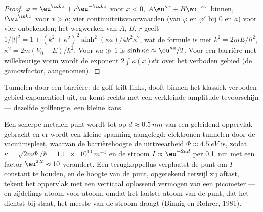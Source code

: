 \begin{proof}
$\varphi = \eu^{\iu kx} + r\eu^{-\iu kx}$ voor $x < 0$,
$A\eu^{\kappa x} + B\eu^{-\kappa x}$
binnen, $t\eu^{\iu kx}$ voor $x > a$; vier continuïteitsvoorwaarden (van $\varphi$
en $\varphi'$ bij $0$ en $a$) voor vier onbekenden; het wegwerken van $A$, $B$, $r$
geeft $1/|t|^2 = 1 + (k^2 + \kappa^2)^2\sinh^2(\kappa a)/4k^2\kappa^2$, wat
de formule is met $k^2 = 2mE/\hbar^2$, $\kappa^2 = 2m(V_0 - E)/\hbar^2$. Voor
$\kappa a \gg 1$ is $\sinh\kappa a \approx \eu^{\kappa a}/2$. Voor een barrière met
willekeurige vorm wordt de exponent $2\int\kappa(x)\dd x$ over het
verboden gebied (de gamowfactor, aangenomen).
\end{proof}

\begin{omfigure}

{\small Tunnelen door een barrière: de golf trilt links,
dooft binnen het klassiek verboden gebied exponentieel uit, en
komt rechts met een verkleinde amplitude tevoorschijn --- dezelfde golflengte,
een kleine kans.}
\end{omfigure}

\begin{example}[De rastertunnelmicroscoop]\label{ex:b2:potential-wells-tunneling:stm}
Een scherpe metalen punt wordt tot op $d \approx \qty{0.5}{nm}$ van een
geleidend oppervlak gebracht en er wordt een kleine spanning aangelegd:
elektronen tunnelen door
de vacuümspleet, waarvan de barrièrehoogte de uittreearbeid
$\Phi \approx
\qty{4.5}{eV}$ is, zodat
$\kappa = \sqrt{2m\Phi}/\hbar = \qty{1.1e10}{m^{-1}}$ en
de stroom $I \propto \eu^{-2\kappa d}$ per \qty{0.1}{nm} met een factor
$\eu^{2.2} \approx
10$ verandert. Een terugkoppellus verplaatst de punt om
$I$
constant te houden, en de hoogte van de punt, opgetekend terwijl zij aftast,
tekent het oppervlak
met een verticaal oplossend vermogen van een picometer --- en zijdelings atoom voor
atoom, omdat het laatste atoom van de punt, dat het dichtst bij staat, het meeste
van de stroom draagt (Binnig en Rohrer, 1981).
\end{example}

